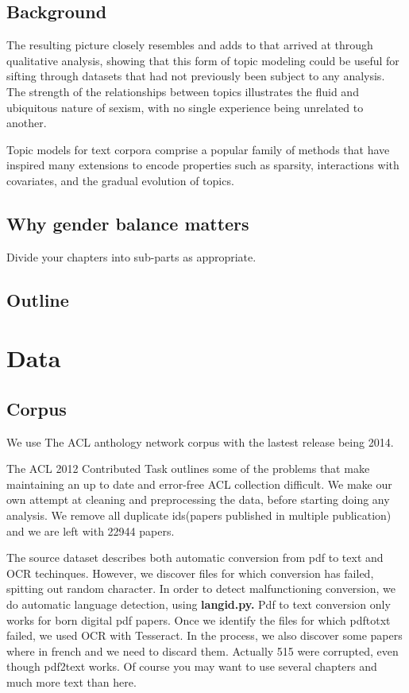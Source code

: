 \documentclass[bsc,frontabs,twoside,singlespacing,parskip,deptreport]{infthesis}     %
\begin{document}
\section{Background}

 The resulting picture closely resembles and adds to that arrived at through qualitative analysis, showing that this form of topic modeling could be useful for sifting through datasets that had not previously been subject to any analysis. The strength of the relationships between topics illustrates the fluid and ubiquitous nature of sexism, with no single experience being unrelated to another.

Topic models for text corpora comprise a popular family of methods that have inspired many extensions to encode properties such as sparsity, interactions with covariates, and the gradual evolution of topics.
\section{Why gender balance matters}

Divide your chapters into sub-parts as appropriate.

\section{Outline}

\chapter{Data}
\section{Corpus}
We use The ACL anthology network corpus \cite{aan} with the lastest release being 2014. 

The  ACL 2012 Contributed Task \cite{contributed} outlines some of the problems that make maintaining an up to date and error-free ACL collection difficult. We make our own attempt at cleaning and preprocessing the data, before starting doing any analysis.
We remove all duplicate ids(papers published in multiple publication) and we are left with 22944 papers. 

The source dataset describes both automatic conversion from pdf to text and OCR techinques. However, we discover files for which conversion has failed, spitting out random character.
In order to detect malfunctioning conversion, we do automatic language detection, using \textbf{langid.py.} \cite{langid}
Pdf to text conversion only works for born digital pdf papers. Once we identify the files for which pdftotxt failed, we used OCR with Tesseract. In the process, we also discover some papers where in french and we need to discard them. Actually 515 were corrupted, even though pdf2text works.
Of course
you may want to use several chapters and much more text than here.
\end{document}
